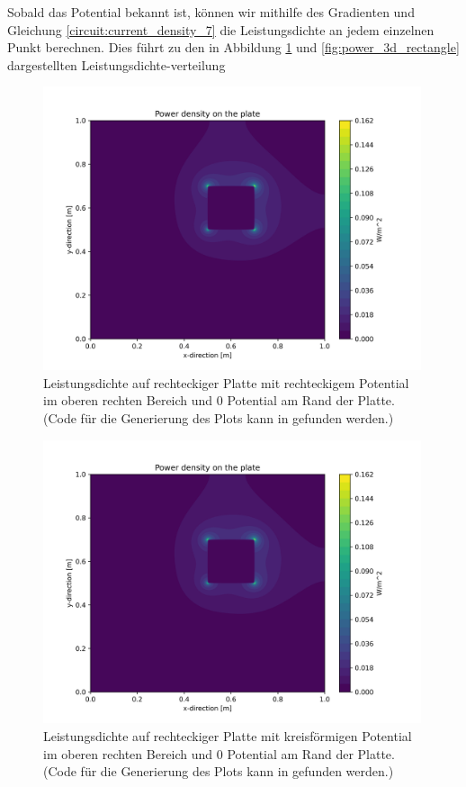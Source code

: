 Sobald das Potential bekannt ist, können wir mithilfe des Gradienten und Gleichung \eqref{circuit:current_density_7} die Leistungsdichte an jedem einzelnen Punkt berechnen. Dies führt zu den in Abbildung \ref{fig:power_2d} und \ref{fig:power_3d_rectangle} dargestellten Leistungsdichte-verteilung \cite{github:AndreasFMueller}
\begin{figure}[h]
	\centering
	\includegraphics[width=0.99\textwidth]{papers/circuit/power_distribution.png}
	\caption{Leistungsdichte auf rechteckiger Platte mit rechteckigem Potential im oberen rechten Bereich und 0 Potential am Rand der Platte. (Code für die Generierung des Plots kann in \cite{github:AndreasFMueller} gefunden werden.)}
	\label{fig:power_2d}
\end{figure}
\begin{figure}[h]
	\centering
	\includegraphics[width=0.99\textwidth]{papers/circuit/power_distribution_circle.png}
	\caption{Leistungsdichte auf rechteckiger Platte mit kreisförmigen Potential im oberen rechten Bereich und 0 Potential am Rand der Platte. (Code für die Generierung des Plots kann in \cite{github:AndreasFMueller} gefunden werden.) }
	\label{fig:power_2d_circle}
\end{figure}
